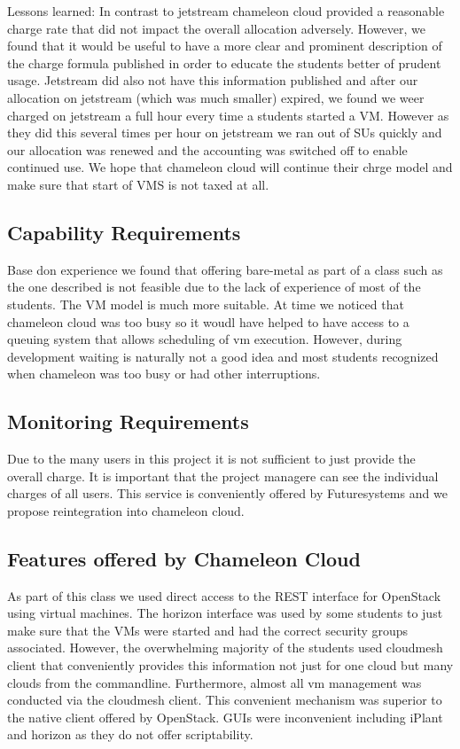 \documentclass[sigconf]{acmart}
\begin{document}
Lessons learned: In contrast to jetstream chameleon cloud provided a
reasonable charge rate that did not impact the overall allocation
adversely. However, we found that it would be useful to have a more
clear and prominent description of the charge formula published in
order to educate the students better of prudent usage. Jetstream did
also not have this information published and after our allocation on
jetstream (which was much smaller) expired, we found we weer charged
on jetstream a full hour every time a students started a VM. However
as they did this several times per hour on jetstream we ran out of SUs
quickly and our allocation was renewed and the accounting was switched
off to enable continued use. We hope that chameleon cloud will
continue their chrge model and make sure that start of VMS is not
taxed at all.

\subsection{Capability Requirements}

Base don experience we found that offering bare-metal as part of a
class such as the one described is not feasible due to the lack of
experience of most of the students. The VM model is much more
suitable. At time we noticed that chameleon cloud was too busy so it
woudl have helped to have access to a queuing system that allows
scheduling of vm execution. However, during development waiting is
naturally not a good idea and most students recognized when chameleon
was too busy or had other interruptions.

\subsection{Monitoring Requirements}

Due to the many users in this project it is not sufficient to just
provide the overall charge. It is important that the project managere
can see the individual charges of all users. This service is
conveniently offered by Futuresystems and we propose reintegration
into chameleon cloud.

\subsection{Features offered by Chameleon Cloud}

As part of this class we used direct access to the REST interface for
OpenStack using virtual machines. The horizon interface was used by
some students to just make sure that the VMs were started and had the
correct security groups associated. However, the overwhelming majority
of the students used cloudmesh client that conveniently provides this
information not just for one cloud but many clouds from the
commandline. Furthermore, almost all vm management was conducted via
the cloudmesh client. This convenient mechanism was superior to the
native client offered by OpenStack. GUIs were inconvenient including
iPlant and horizon as they do not offer scriptability.
\end{document}
